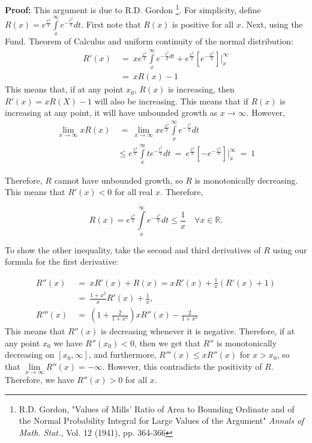 \documentclass[12pt]{article}
\newcommand{\eq }{\: = \:}
\theoremstyle{nonumberplain}
\begin{document}
\textbf{Proof:} This argument is due to R.D. Gordon \footnote{R.D. Gordon, "Values of Mills' Ratio of Area to Bounding Ordinate and of the Normal Probability Integral for Large Values of the Argument" \textit{Annals of Math. Stat.,} Vol. 12 (1941), pp. 364-366}. For simplicity, define $R(x) = e ^{\frac{x^2}{2}} \int \limits_{x}^{\infty} e^ {- \frac{t^2}{2}}dt$. First note that $R(x)$ is positive for all $x$. Next, using the Fund. Theorem of Calculus and uniform continuity of the normal distribution:
\begin{align*}
R'(x) &\eq x e ^{\frac{x^2}{2}} \int \limits_{x}^{\infty} e^ {- \frac{t^2}{2}dt} + e ^{\frac{x^2}{2}} \left[e ^{- \frac{x^2}{2}} \right] \biggr|_{x}^{\infty} \\
&\eq  xR(x) - 1
\end{align*}
This means that, if at any point $x_0$, $R(x)$ is increasing, then $R'(x) = xR(X) - 1$ will also be increasing. This means that if $R(x)$ is increasing at any point, it will have unbounded growth as $x \to \infty$. However,
\begin{align*}
\lim \limits_{x \to \infty} xR(x) &\eq \lim \limits_{x \to \infty}  x e ^{\frac{x^2}{2}} \int \limits_{x}^{\infty} e^ {- \frac{t^2}{2}}dt \\
&\le  e ^{\frac{x^2}{2}} \int \limits_{x}^{\infty} t e^ {- \frac{t^2}{2}}dt \eq e ^{\frac{x^2}{2}} \left[ - e ^{- \frac{x^2}{2}} \right] \biggr|_{x}^{\infty} \eq 1
\end{align*}

Therefore, $R$ cannot have unbounded growth, so $R$ is monotonically decreasing. This means that $R'(x) < 0$ for all real $x$. Therefore,

$$
R(x) = e ^{\frac{x^2}{2}} \int \limits_{x}^{\infty} e^ {- \frac{x^2}{2}}dt \le \frac{1}{x} \quad \forall x \in \mathbb{R}.
$$

To show the other inequality, take the second and third derivatives of $R$ using our formula for the first derivative:

\begin{align*}
R''(x) &\eq xR'(x) + R(x) = xR'(x) + \frac{1}{x}(R'(x) + 1) \\
&\eq \frac{1 + x^2}{x}R'(x) + \frac{1}{x}, \\
R'''(x) &\eq (1 + \frac{2}{1 + x^2})xR''(x) - \frac{2}{1 + x^2}
\end{align*}
This means that $R''(x)$ is decreasing whenever it is negative. Therefore, if at any point $x_0$ we have $R''(x_0) < 0$, then we get that $R''$ is monotonically decreasing on $[x_0, \infty]$, and furthermore, $R'''(x) \le xR''(x)$ for $x > x_0$, so that $\lim \limits_{x \to \infty} R''(x) = - \infty$. However, this contradicts the positivity of $R$. Therefore, we have $R''(x) > 0$ for all $x$. 
\end{document}
